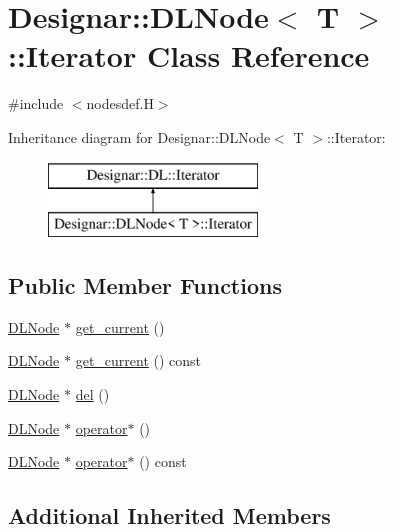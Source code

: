 \hypertarget{class_designar_1_1_d_l_node_1_1_iterator}{}\section{Designar\+:\+:D\+L\+Node$<$ T $>$\+:\+:Iterator Class Reference}
\label{class_designar_1_1_d_l_node_1_1_iterator}


{\ttfamily \#include $<$nodesdef.\+H$>$}

Inheritance diagram for Designar\+:\+:D\+L\+Node$<$ T $>$\+:\+:Iterator\+:\begin{figure}[H]
\begin{center}
\leavevmode
\includegraphics[height=2.000000cm]{class_designar_1_1_d_l_node_1_1_iterator}
\end{center}
\end{figure}
\subsection*{Public Member Functions}
\begin{DoxyCompactItemize}
\item 
\hyperlink{class_designar_1_1_d_l_node}{D\+L\+Node} $\ast$ \hyperlink{class_designar_1_1_d_l_node_1_1_iterator_a5787051e4f6727efef70ac3f8991ab59}{get\+\_\+current} ()
\item 
\hyperlink{class_designar_1_1_d_l_node}{D\+L\+Node} $\ast$ \hyperlink{class_designar_1_1_d_l_node_1_1_iterator_a1ea2b71da1fbc4970b9a1c170ddacb13}{get\+\_\+current} () const
\item 
\hyperlink{class_designar_1_1_d_l_node}{D\+L\+Node} $\ast$ \hyperlink{class_designar_1_1_d_l_node_1_1_iterator_a7ba9818dbd9d8cbbd85fe47db3395375}{del} ()
\item 
\hyperlink{class_designar_1_1_d_l_node}{D\+L\+Node} $\ast$ \hyperlink{class_designar_1_1_d_l_node_1_1_iterator_a37adeeda3073b950590700c3e22dcf28}{operator$\ast$} ()
\item 
\hyperlink{class_designar_1_1_d_l_node}{D\+L\+Node} $\ast$ \hyperlink{class_designar_1_1_d_l_node_1_1_iterator_ae75896ae631f91daaaa9a193df27a239}{operator$\ast$} () const
\end{DoxyCompactItemize}
\subsection*{Additional Inherited Members}


